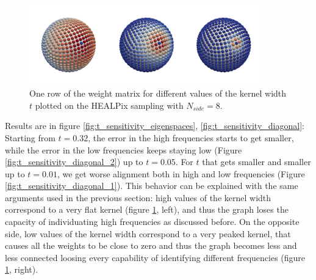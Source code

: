 \begin{figure}[h!]
	\centering
	\includegraphics[width=0.9\textwidth]{figs/chapter1/t.png}	
	\caption{\label{fig:weights}One row of the weight matrix for different values of the kernel width $t$ plotted on the HEALPix sampling with $N_{side}=8$.}
\end{figure}

Results are in figure \ref{fig:t_sensitivity_eigenspaces}, \ref{fig:t_sensitivity_diagonal}: Starting from $t=0.32$, the error in the high frequencies starts to get smaller, while the error in the low frequencies keeps staying low (Figure \ref{fig:t_sensitivity_diagonal_2}) up to $t=0.05$. For $t$ that gets smaller and smaller up to $t=0.01$, we get worse alignment both in high and low frequencies (Figure \ref{fig:t_sensitivity_diagonal_1}). This behavior can be explained with the same arguments used in the previous section: high values of the kernel width correspond to a very flat kernel (figure \ref{fig:weights}, left), and thus the graph loses the capacity of individuating high frequencies as discussed before. On the opposite side, low values of the kernel width correspond to a very peaked kernel, that causes all the weights to be close to zero and thus the graph becomes less and less connected loosing every capability of identifying different frequencies  (figure \ref{fig:weights}, right). 

